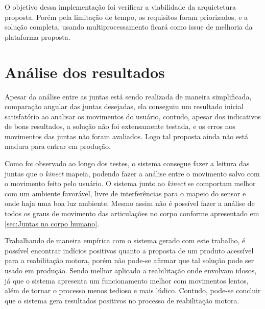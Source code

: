 O objetivo dessa implementação foi verificar a viabilidade da arquietetura proposta. Porém
pela limitação de tempo, os requisitos foram priorizados, e a solução completa, usando multiprocessamento ficará como issue de melhoria da plataforma proposta.

\section{Análise dos resultados}\label{sol:viabilidade}
Apesar da análise entre as juntas está sendo realizada de maneira simplificada, comparação angular das juntas desejadas, ela conseguiu um resultado inicial satisfatório
ao analisar os movimentos do usuário, contudo, apesar dos indicativos de bons resultados, a solução não foi extensamente testada, e os erros nos movimentos das juntas não foram avaliados. Logo tal proposta ainda não está madura para entrar em produção.

Como foi observado ao longo dos testes, o sistema consegue fazer a leitura das juntas  que o \textit{kinect} mapeia, podendo fazer a análise entre o movimento
salvo com o movimento feito pelo usuário. O sistema junto ao \textit{kinect} se comportam melhor com um ambiente favorável, livre de interferências para o mapeio do sensor
e onde haja uma boa luz ambiente. Mesmo assim não é possível fazer a análise de todos os graus de movimento das articulações no corpo conforme apresentado em \ref{sec:Juntas no corpo humano}.

  Trabalhando de maneira empírica com o sistema gerado com este trabalho, é possível encontrar indícios positivos quanto a proposta de um produto acessível para a reabilitação motora,
  porém não pode-se afirmar que tal solução pode ser usado em produção. Sendo melhor aplicado a reabilitação onde envolvam idosos, já que o sistema apresenta
  um funcionamento melhor com movimentos lentos, além de tornar o processo
menos tedioso e mais lúdico. Contudo, pode-se concluir que o sistema gera resultados positivos no processo de reabilitação motora.
